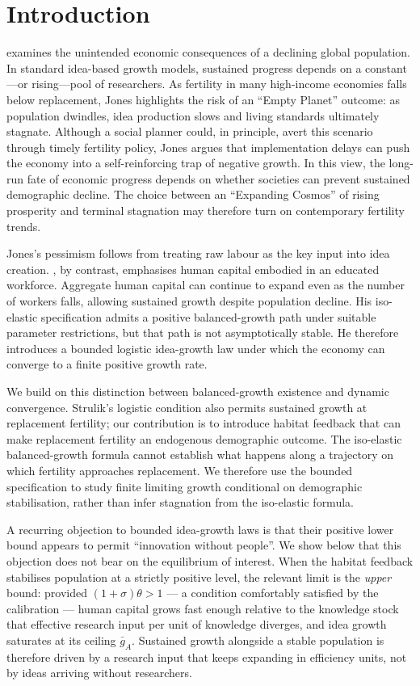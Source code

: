 \documentclass[11pt]{article}
\begin{document}
\section{Introduction}
\citet{jones22} examines the unintended economic consequences of a declining global population. In standard idea-based growth models, sustained progress depends on a constant—or rising—pool of researchers. As fertility in many high-income economies falls below replacement, Jones highlights the risk of an “Empty Planet” outcome: as population dwindles, idea production slows and living standards ultimately stagnate. Although a social planner could, in principle, avert this scenario through timely fertility policy, Jones argues that implementation delays can push the economy into a self-reinforcing trap of negative growth. In this view, the long-run fate of economic progress depends on whether societies can prevent sustained demographic decline. The choice between an “Expanding Cosmos” of rising prosperity and terminal stagnation may therefore turn on contemporary fertility trends.

Jones's pessimism follows from treating raw labour as the key input into idea creation. \citet{STRULIK2024104943}, by contrast, emphasises human capital embodied in an educated workforce. Aggregate human capital can continue to expand even as the number of workers falls, allowing sustained growth despite population decline. His iso-elastic specification admits a positive balanced-growth path under suitable parameter restrictions, but that path is not asymptotically stable. He therefore introduces a bounded logistic idea-growth law under which the economy can converge to a finite positive growth rate.

We build on this distinction between balanced-growth existence and dynamic convergence. Strulik's logistic condition also permits sustained growth at replacement fertility; our contribution is to introduce habitat feedback that can make replacement fertility an endogenous demographic outcome. The iso-elastic balanced-growth formula cannot establish what happens along a trajectory on which fertility approaches replacement. We therefore use the bounded specification to study finite limiting growth conditional on demographic stabilisation, rather than infer stagnation from the iso-elastic formula.

A recurring objection to bounded idea-growth laws is that their positive lower bound appears to
permit ``innovation without people''. We show below that this objection does not bear on the
equilibrium of interest. When the habitat feedback stabilises population at a strictly positive
level, the relevant limit is the \emph{upper} bound: provided $(1+\sigma)\theta>1$ --- a condition
comfortably satisfied by the calibration --- human capital grows fast enough relative to the
knowledge stock that effective research input per unit of knowledge diverges, and idea growth
saturates at its ceiling $\bar g_A$. Sustained growth alongside a stable population is therefore
driven by a research input that keeps expanding in efficiency units, not by ideas arriving without
researchers.
\end{document}
